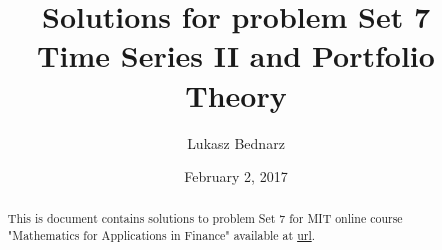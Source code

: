 \documentclass[fleqn]{amsart}
\begin{document}
\def\mathbi#1{\textbf{\em #1}}

\title[Problem Set 5]{Solutions for problem Set 7 \\ Time Series II and Portfolio Theory}
\author{Lukasz Bednarz}
\date{February 2, 2017}
\begin{abstract}
This is document contains solutions to problem Set 7 for MIT online course "Mathematics for Applications in Finance" available at 
\href{http://ocw.mit.edu/courses/mathematics/18-s096-topics-in-mathematics-with-applications-in-finance-fall-2013/index.htm}{url}.

\end{abstract}
\maketitle

\section{}


\section{}
%




\end{document}
